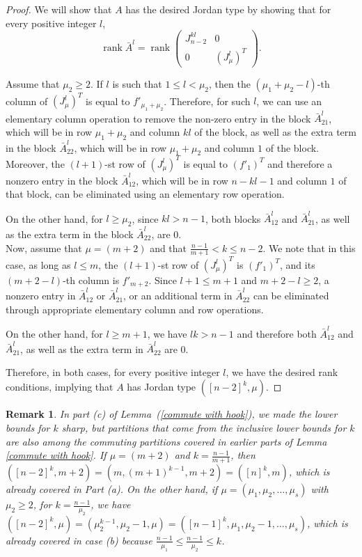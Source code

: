 \documentclass[10pt,a4paper]{amsart}
\newtheorem{rem}[thm]{Remark}
\DeclareMathOperator{\rank}{rank}
\begin{document}
\begin{proof}
We will show that $A$ has the desired Jordan type by showing that for every positive integer $l$, 
\[\rank\bar{A}^l=\rank \left( 
\begin{array}{c|c}
  J_{n-2}^{kl} & 0 \\
 \hline
  0& \left(J^l_\mu\right)^T
\end{array}
\right).\]

 Assume that $\mu_2\geq 2$. If $l$ is such that $1\leq l <\mu_2$, then the $(\mu_1+\mu_2-l)$-th column of $\left(J^l_\mu\right)^T$ is equal to $f'_{\mu_1+\mu_2}$. Therefore, for such $l$, we can use an elementary column operation to remove the non-zero entry in the block $\bar{A}^l_{21}$, which will be in row $\mu_1+\mu_2$ and column $kl$ of the block, as well as the extra term in the block $\bar{A}^l_{22}$, which will be in row $\mu_1+\mu_2$ and column $1$ of the block. Moreover, the $(l+1)$-st row of $\left(J^l_\mu\right)^T$ is equal to $(f'_1)^T$ and therefore a nonzero entry in the block $\bar{A}^l_{12}$, which will be in row $n-kl-1$ and column $1$ of that block, can be eliminated using an elementary row operation. 

On the other hand, for $l\geq \mu_2$, since $kl> n-1$, both blocks $\bar{A}^l_{12}$ and $\bar{A}^l_{21}$, as well as the extra term in the block $\bar{A}^l_{22}$, are 0.
\\

 Now, assume that $\mu=(m+2)$ and that $\frac{n-1}{m+1}< k \leq n-2$. We note that in this case, as long as $l\leq m$, the $(l+1)$-st row of $\left(J^l_\mu\right)^T$ is $(f'_1)^T$, and its $(m+2-l)$-th column is $f'_{m+2}$. Since $l+1\leq m+1$ and $m+2-l\geq 2$, a nonzero entry in $\bar{A}^l_{12}$ or $\bar{A}^l_{21}$, or an additional term in $\bar{A}^l_{22}$ can be eliminated through appropriate elementary column and row operations.

On the other hand, for $l\geq m+1$, we have $lk> n-1$ and therefore both $\bar{A}^l_{12}$ and $\bar{A}^l_{21}$, as well as the extra term in $\bar{A}^l_{22}$ are 0.

Therefore, in both cases, for every positive integer $l$, we have the desired rank conditions, implying that $A$ has Jordan type $([n-2]^k, \mu)$.
\end{proof}

\begin{rem}
In part (c) of Lemma~(\ref{commute with hook}), we made the lower bounds for $k$ sharp, but partitions that come from the inclusive lower bounds for $k$ are also among the commuting partitions covered in earlier parts of Lemma \ref{commute with hook}. If $\mu=(m+2)$ and $k=\frac{n-1}{m+1}$, then $([n-2]^k, m+2)=(m,(m+1)^{k-1},m+2)=([n]^k, m)$, which is already covered in Part (a). On the other hand, if $\mu=(\mu_1, \mu_2, \ldots, \mu_s)$ with $\mu_2\geq 2$, for $k=\frac{n-1}{\mu_2}$, we have $([n-2]^k, \mu)=(\mu_2^{k-1}, \mu_2-1, \mu)=([n-1]^k, \mu_1,\mu_2-1, \ldots, \mu_s)$, which is already covered in case (b) because $\frac{n-1}{\mu_1}\leq \frac{n-1}{\mu_2}\leq k$.
\end{rem}
\end{document}
